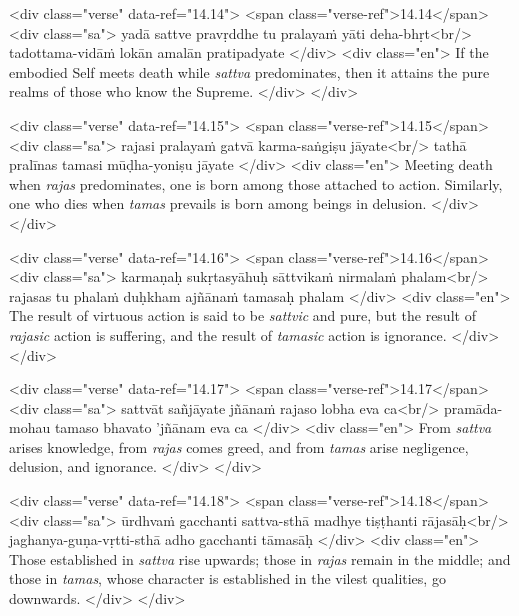 \begin{html}
<div class="verse" data-ref="14.14">
  <span class="verse-ref">14.14</span>
  <div class="sa">
    yadā sattve pravṛddhe tu pralayaṁ yāti deha-bhṛt<br/>
    tadottama-vidāṁ lokān amalān pratipadyate
  </div>
  <div class="en">
    If the embodied Self meets death while \textit{sattva} predominates, then it attains the pure realms of those who know the Supreme.
  </div>
</div>
\end{html}



\begin{html}
<div class="verse" data-ref="14.15">
  <span class="verse-ref">14.15</span>
  <div class="sa">
    rajasi pralayaṁ gatvā karma-saṅgiṣu jāyate<br/>
    tathā pralīnas tamasi mūḍha-yoniṣu jāyate
  </div>
  <div class="en">
    Meeting death when \textit{rajas} predominates, one is born among those attached to action. Similarly, one who dies when \textit{tamas} prevails is born among beings in delusion.
  </div>
</div>
\end{html}



\begin{html}
<div class="verse" data-ref="14.16">
  <span class="verse-ref">14.16</span>
  <div class="sa">
    karmaṇaḥ sukṛtasyāhuḥ sāttvikaṁ nirmalaṁ phalam<br/>
    rajasas tu phalaṁ duḥkham ajñānaṁ tamasaḥ phalam
  </div>
  <div class="en">
    The result of virtuous action is said to be \textit{sattvic} and pure, but the result of \textit{rajasic} action is suffering, and the result of \textit{tamasic} action is ignorance.
  </div>
</div>
\end{html}



\begin{html}
<div class="verse" data-ref="14.17">
  <span class="verse-ref">14.17</span>
  <div class="sa">
    sattvāt sañjāyate jñānaṁ rajaso lobha eva ca<br/>
    pramāda-mohau tamaso bhavato ’jñānam eva ca
  </div>
  <div class="en">
    From \textit{sattva} arises knowledge, from \textit{rajas} comes greed, and from \textit{tamas} arise negligence, delusion, and ignorance.
  </div>
</div>
\end{html}



\begin{html}
<div class="verse" data-ref="14.18">
  <span class="verse-ref">14.18</span>
  <div class="sa">
    ūrdhvaṁ gacchanti sattva-sthā madhye tiṣṭhanti rājasāḥ<br/>
    jaghanya-guṇa-vṛtti-sthā adho gacchanti tāmasāḥ
  </div>
  <div class="en">
    Those established in \textit{sattva} rise upwards; those in \textit{rajas} remain in the middle; and those in \textit{tamas}, whose character is established in the vilest qualities, go downwards.
  </div>
</div>
\end{html}


